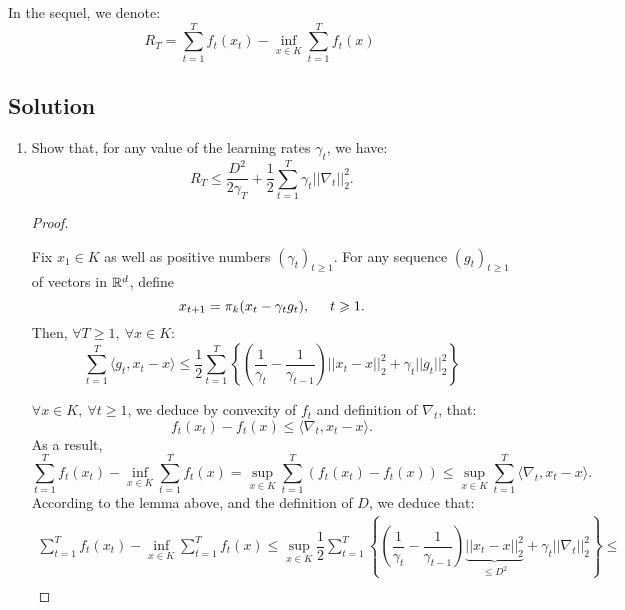 \documentclass[12pt]{report}
\begin{document}
    \begin{note}{}{}
    In the sequel, we denote:
    \[
        R_T = \sum\limits_{t=1}^T f_t(x_t) - \inf\limits_{x\in K} \sum\limits_{t=1}^T f_t(x)  
    \]
    \end{note}
    \subsection*{Solution}

            \begin{enumerate}
                \item Show that, for any value of the learning rates $\gamma_t$, we have:
                \[
                    R_T \leq \dfrac{D^2}{2\gamma_T} + \dfrac{1}{2} \sum\limits_{t=1}^T \gamma_t ||\nabla_t||_2^2.  
                \]
                \begin{proof}
                    \begin{lemma}{}{}
                        Fix $x_1 \in K$ as well as positive numbers $(\gamma_t)_{t\geq 1}$. For any sequence $(g_t)_{t\geq 1}$ of vectors in $\R^d$, define 
                        \[
                            x_{t+1} = \pi_k (x_t - \gamma_t g_t), \hspace*{0.5cm} t \geq 1.  
                        \]
                        Then, $\forall T \geq 1, \ \forall x \in K$:
                        \[
                            \sum\limits_{t=1}^T \langle g_t, x_t - x \rangle \leq \dfrac{1}{2} \sum\limits_{t=1}^T \left\{\left(\dfrac{1}{\gamma_t} - \dfrac{1}{\gamma_{t-1}}\right) ||x_t - x||_2^2 + \gamma_t||g_t||_2^2\right\}
                        \]
                    \end{lemma}
                    $\forall x \in K, \ \forall t \geq 1$, we deduce by convexity of $f_t$ and definition of $\nabla_t$, that:
                    \[
                        f_t(x_t) - f_t(x) \leq \langle \nabla_t, x_t - x \rangle.  
                    \]
                    As a result, 
                    \[
                        \sum\limits_{t=1}^T f_t(x_t) - \inf\limits_{x \in K} \sum\limits_{t=1}^T f_t(x) = \sup\limits_{x\in K} \sum\limits_{t=1}^T \left(f_t(x_t) - f_t(x)\right) \leq \sup\limits_{x\in K}\sum\limits_{t=1}^T \langle \nabla_t, x_t - x \rangle.
                    \]
                    According to the lemma above, and the definition of $D$, we deduce that:
                    \[
                        \begin{array}{c}
                            \displaystyle \sum\limits_{t=1}^T f_t(x_t) - \inf\limits_{x\in K} \sum\limits_{t=1}^T f_t(x) \leq \sup\limits_{x \in K} \dfrac{1}{2} \sum\limits_{t=1}^T \left\{\left(\dfrac{1}{\gamma_t} - \dfrac{1}{\gamma_{t-1}}\right) \underbrace{||x_t - x||_2^2}_{\leq D^2} + \gamma_t ||\nabla_t||_2^2 \right\} \leq \\ 

\end{array}\]
\end{proof}
\end{enumerate}
\end{document}
